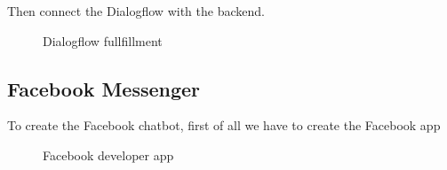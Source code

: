 \documentclass[12pt,oneside,openright,a4paper]{cpe-english-project}
\begin{document}
		\begin{flushleft}
			Then connect the Dialogflow with the backend.
		\end{flushleft}
		\begin{figure}[!h]\centering
			\caption{Dialogflow fullfillment}\label{fig:Dialogflow fullfillment}
		\end{figure}
\pagebreak
	\subsection{Facebook Messenger}
		\begin{flushleft}
			To create the Facebook chatbot, first of all we have to create the Facebook app
		\end{flushleft}
		\begin{figure}[!h]\centering
			\caption{Facebook developer app}\label{fig:facebook developer app}
		\end{figure}
\end{document}
